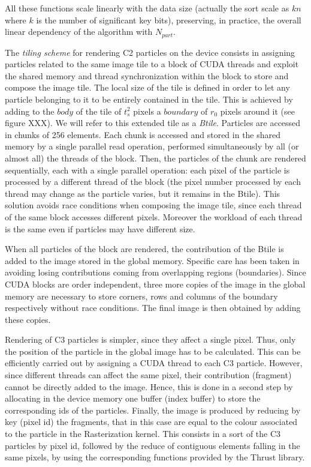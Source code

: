 \documentclass[11pt]{article}
\begin{document}
All these functions scale linearly with the data size (actually the sort scale 
as $kn$ where $k$ is the number of significant key bits),
preserving, in practice, the overall linear dependency of the algorithm with $N_{part}$.

The \textit{tiling scheme} for rendering C2 particles on the device consists in 
assigning particles related to the same image tile to a block of CUDA threads 
and exploit the shared memory and thread synchronization within the block to store 
and compose the image tile. The local size of the tile is defined in order to let any particle belonging to it to be entirely contained in the tile. This is achieved by 
adding to the $body$ of the tile of $t_s^2$ pixels a $boundary$ of $r_0$ pixels around it (see figure XXX). We will refer to this extended tile as a \textit{Btile}.
Particles are accessed in chunks of 256 elements. Each chunk is accessed and stored 
in the shared memory by a single parallel read operation, performed simultaneously by all (or almost all) the threads of the block. Then, the particles of the chunk are rendered sequentially, each with a single parallel operation: each pixel of the particle is processed by a different thread of the block (the pixel number processed by each thread may change as the particle varies, but it remains in the Btile). 
This solution avoids race conditions when composing the image tile, since each 
thread of the same block accesses different pixels. Moreover the workload of each thread is the same even if particles may have different size.

When all particles of the block are rendered, the contribution of the Btile 
is added to the image stored in the global memory. 
Specific care has been taken in avoiding losing contributions coming 
from overlapping regions (boundaries). Since CUDA blocks are order independent, three more copies of the image in the global memory are necessary to store corners, rows and columns of the boundary respectively without race conditions. The final image is then obtained by adding these copies.

Rendering of C3 particles is simpler, since they affect a single pixel. 
Thus, only the position of the particle in the global image has to be calculated.
This can be efficiently carried out by assigning a CUDA thread to each C3 particle. 
However, since different threads can affect the same pixel, their contribution (fragment) cannot be directly added to the image. Hence, this is done in a second step by allocating in the device memory one buffer (index buffer) to store the corresponding ids of the particles. Finally, the image is produced by reducing by key (pixel id) the fragments, that in this case are equal to the colour associated to the particle in the Rasterization kernel. This consists in a sort of the C3 particles by pixel id, followed by the reduce of 
contiguous elements falling in the same pixels, by using the corresponding 
functions provided by the Thrust library.
\end{document}
